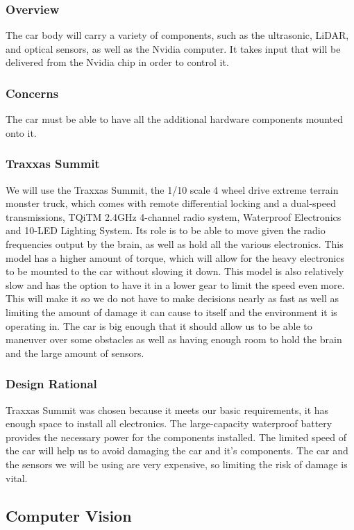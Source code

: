 \documentclass[onecolumn, draftclsnofoot, 10pt, compsoc]{IEEEtran}
\begin{document}
\subsubsection{Overview}
The car body will carry a variety of components, such as the ultrasonic, LiDAR, and optical sensors, as well as the Nvidia computer. It takes input that will be delivered from the Nvidia chip in order to control it.

\subsubsection{Concerns}
The car must be able to have all the additional hardware components mounted onto it.

\subsubsection{Traxxas Summit}
We will use the Traxxas Summit, the 1/10 scale 4 wheel drive extreme terrain monster truck, which comes with remote differential locking and a dual-speed transmissions, TQiTM 2.4GHz 4-channel radio system, Waterproof Electronics and 10-LED Lighting System. Its role is to be able to move given the radio frequencies output by the brain, as well as hold all the various electronics. This model has a higher amount of torque, which will allow for the heavy electronics to be mounted to the car without slowing it down. This model is also relatively slow and has the option to have it in a lower gear to limit the speed even more. This will make it so we do not have to make decisions nearly as fast as well as limiting the amount of damage it can cause to itself and the environment it is operating in. The car is big enough that it should allow us to be able to maneuver over some obstacles as well as having enough room to hold the brain and the large amount of sensors.


\subsubsection{Design Rational}
Traxxas Summit was chosen because it meets our basic requirements, it has enough space to install all electronics. The large-capacity waterproof battery provides the necessary power for the components installed. The limited speed of the car will help us to avoid damaging the car and it’s components. The car and the sensors we will be using are very expensive, so limiting the risk of damage is vital.

\subsection{Computer Vision}
\end{document}
